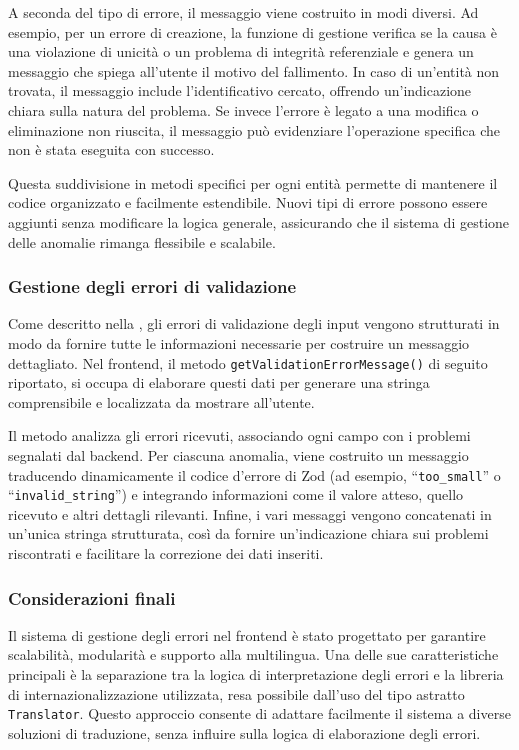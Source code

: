 A seconda del tipo di errore, il messaggio viene costruito in modi diversi. Ad esempio, per un errore di creazione, la funzione di gestione verifica se la causa è una violazione di unicità o un problema di integrità referenziale e genera un messaggio che spiega all’utente il motivo del fallimento. In caso di un’entità non trovata, il messaggio include l’identificativo cercato, offrendo un'indicazione chiara sulla natura del problema. Se invece l’errore è legato a una modifica o eliminazione non riuscita, il messaggio può evidenziare l’operazione specifica che non è stata eseguita con successo.

Questa suddivisione in metodi specifici per ogni entità permette di mantenere il codice organizzato e facilmente estendibile. Nuovi tipi di errore possono essere aggiunti senza modificare la logica generale, assicurando che il sistema di gestione delle anomalie rimanga flessibile e scalabile.

\subsubsection{Gestione degli errori di validazione}
Come descritto nella , gli errori di validazione degli input vengono strutturati in modo da fornire tutte le informazioni necessarie per costruire un messaggio dettagliato. Nel frontend, il metodo \texttt{getValidationErrorMessage()} di seguito riportato, si occupa di elaborare questi dati per generare una stringa comprensibile e localizzata da mostrare all’utente.
%

%
Il metodo analizza gli errori ricevuti, associando ogni campo con i problemi segnalati dal backend. Per ciascuna anomalia, viene costruito un messaggio traducendo dinamicamente il codice d’errore di Zod (ad esempio, ``\texttt{too\_small}'' o ``\texttt{invalid\_string}'') e integrando informazioni come il valore atteso, quello ricevuto e altri dettagli rilevanti. Infine, i vari messaggi vengono concatenati in un'unica stringa strutturata, così da fornire un’indicazione chiara sui problemi riscontrati e facilitare la correzione dei dati inseriti.

\subsubsection{Considerazioni finali}
Il sistema di gestione degli errori nel frontend è stato progettato per garantire scalabilità, modularità e supporto alla multilingua. Una delle sue caratteristiche principali è la separazione tra la logica di interpretazione degli errori e la libreria di internazionalizzazione utilizzata, resa possibile dall’uso del tipo astratto \texttt{Translator}. Questo approccio consente di adattare facilmente il sistema a diverse soluzioni di traduzione, senza influire sulla logica di elaborazione degli errori.

